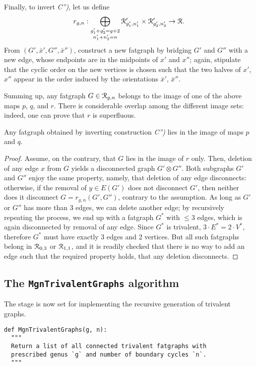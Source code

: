 Finally, to invert {\slshape C'')}, let us define
\begin{equation*}
r_{g,n}: \bigoplus_{\substack{g'_1+g'_2=g+2 \\ n'_1+n'_2=n}} 
\mathcal{R}'_{g'_1, n'_1} \times \mathcal{R}'_{g'_2, n'_2} \to \mathcal{R}.
\end{equation*}
From $(G', \bar{x}', G'',
\bar{x}'')$, construct a new fatgraph by bridging $G'$ and $G''$ with
a new edge, whose endpoints are in the midpoints of $x'$ and $x''$;
again, stipulate that the cyclic order on the new vertices is chosen
such that the two halves of $x'$, $x''$ appear in the order induced by
the orientations $\bar{x}'$, $\bar{x}''$.

Summing up, any fatgraph $G \in \mathcal{R}_{g,n}$ belongs to the image of one
of the above maps $p$, $q$, and $r$. There is considerable
overlap among the different image sets: indeed, one can prove that
$r$ is superfluous.
\begin{lemma}\label{lemma:no-c2}
  Any fatgraph obtained by inverting construction {\slshape C'')} lies in
  the image of maps $p$ and $q$.
\end{lemma}
\begin{proof}
  Assume, on the contrary, that $G$ lies in the image of $r$ only.
  Then, deletion of any edge $x$ from $G$ yields a disconnected graph
  $G' \otimes G''$.  Both subgraphs $G'$ and $G''$ enjoy the same
  property, namely, that deletion of any edge disconnects: otherwise,
  if the removal of $y \in E(G')$ does not disconnect $G'$, then
  neither does it disconnect $G = r_{g,n}(G', G'')$, contrary to the
  assumption. As long as $G'$ or $G''$ has more than 3 edges, we can
  delete another edge; by recursively repeating the process, we end up
  with a fatgraph $G^*$ with $\leq 3$ edges, which is again
  disconnected by removal of any edge.  Since $G^*$ is trivalent, $3
  \cdot E^* = 2 \cdot V^*$, therefore $G^*$ must have exactly 3 edges
  and 2 vertices. But all such fatgraphs belong in $\mathcal{R}_{0,3}$ or
  $\mathcal{R}_{1,1}$, and it is readily checked that there is no way to add an
  edge such that the required property holds, that any deletion
  disconnects.
\end{proof}

\subsection{The \protect\Verb`MgnTrivalentGraphs` algorithm}
\label{sec:MgnTrivalentGraphs}

The stage is now set for implementing the recursive generation of
trivalent graphs.
\begin{lstlisting}
def MgnTrivalentGraphs(g, n):
  """
  Return a list of all connected trivalent fatgraphs with
  prescribed genus `g` and number of boundary cycles `n`.
  """
\end{lstlisting}

